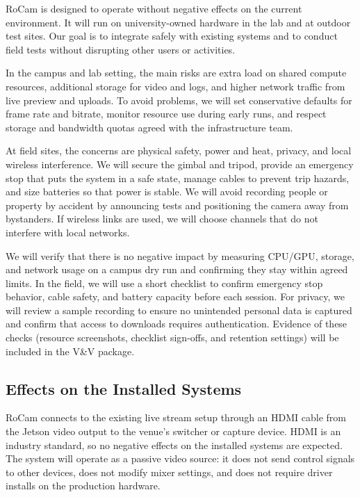 \documentclass[12pt]{article}
\begin{document}
RoCam is designed to operate without negative effects on the current environment. It will run on university-owned hardware in the lab and at outdoor test sites. Our goal is to integrate safely with existing systems and to conduct field tests without disrupting other users or activities.

In the campus and lab setting, the main risks are extra load on shared compute resources, additional storage for video and logs, and higher network traffic from live preview and uploads. To avoid problems, we will set conservative defaults for frame rate and bitrate, monitor resource use during early runs, and respect storage and bandwidth quotas agreed with the infrastructure team.

At field sites, the concerns are physical safety, power and heat, privacy, and local wireless interference. We will secure the gimbal and tripod, provide an emergency stop that puts the system in a safe state, manage cables to prevent trip hazards, and size batteries so that power is stable. We will avoid recording people or property by accident by announcing tests and positioning the camera away from bystanders. If wireless links are used, we will choose channels that do not interfere with local networks.

We will verify that there is no negative impact by measuring CPU/GPU, storage, and network usage on a campus dry run and confirming they stay within agreed limits. In the field, we will use a short checklist to confirm emergency stop behavior, cable safety, and battery capacity before each session. For privacy, we will review a sample recording to ensure no unintended personal data is captured and confirm that access to downloads requires authentication. Evidence of these checks (resource screenshots, checklist sign-offs, and retention settings) will be included in the V\&V package.


\subsection{Effects on the Installed Systems}

RoCam connects to the existing live stream setup through an HDMI cable from the Jetson video output to the venue’s switcher or capture device. HDMI is an industry standard, so no negative effects on the installed systems are expected. The system will operate as a passive video source: it does not send control signals to other devices, does not modify mixer settings, and does not require driver installs on the production hardware.
\end{document}
